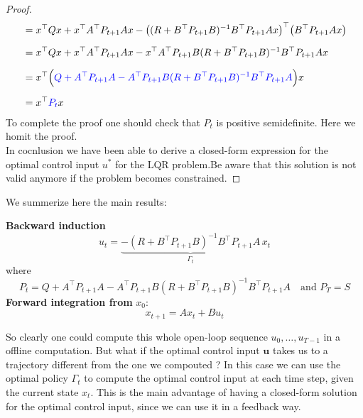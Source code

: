 \begin{proof}
\begin{align*}
&=x^\top Q x
+ x^\top A^\top P_{t+1} A x 
- \bigl((R+B^\top P_{t+1} B)^{-1} B^\top P_{t+1} A x\bigr)^\top \bigl( B^\top P_{t+1} A x \bigr) \\[6pt]
&= x^\top Q x
+ x^\top A^\top P_{t+1} A x
- x^\top A^\top P_{t+1} B
(R + B^\top P_{t+1} B)^{-1}
B^\top P_{t+1} A x \\[6pt]
&=
x^\top
\Big(\textcolor{blue}{
Q + A^\top P_{t+1} A
-
A^\top P_{t+1} B
(R + B^\top P_{t+1} B)^{-1}
B^\top P_{t+1} A}
\Big)
x \\[6pt]
&= x^\top \textcolor{blue}{P_t} x
\end{align*}
To complete the proof one should check that $P_t$ is positive semidefinite. Here we homit the proof.\\
In cocnlusion we have been able to derive a closed-form expression for the optimal control input $u^*$ for the LQR problem.Be aware that this solution is not valid anymore if the problem becomes constrained.\end{proof} 
We summerize here the main results:
\begin{theorembox}
\textbf{Backward induction} 
$$u_t = \underbrace{- (R + B^\top P_{t+1} B)^{-1} B^\top P_{t+1} A}_{\Gamma_t} \,x_t$$
where
$$P_t = Q + A^\top P_{t+1} A - A^\top P_{t+1} B (R + B^\top P_{t+1} B)^{-1} B^\top P_{t+1} A \quad \text{and } P_T = S$$
\textbf{Forward integration from } $x_0$:
$$x_{t+1} = A x_t + B u_t$$
\end{theorembox}
So clearly one could compute this whole open-loop sequence $u_0,\dots,u_{T-1}$ in a offline computation. But what if the optimal control input $\mathbf{u}$ takes us to a trajectory different from the one we compouted ? In this case we can use the optimal policy $\Gamma_t$ to compute the optimal control input at each time step, given the current state $x_t$. This is the main advantage of having a closed-form solution for the optimal control input, since we can use it in a feedback way.\\

